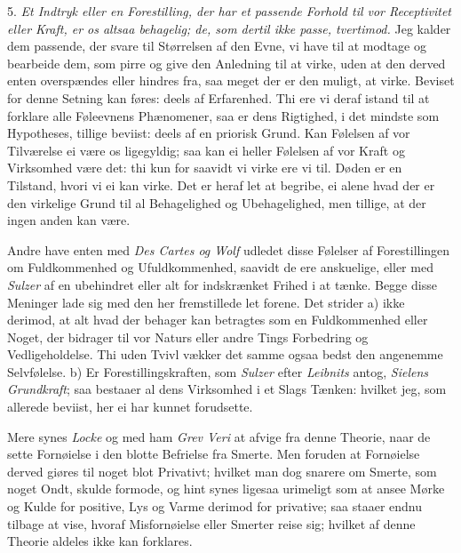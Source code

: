 \documentclass[12pt,a4paper]{article}
\newcommand{\opage}[1]{\marginnote{\footnotesize\textit{[#1]}}}
\begin{document}
5. \emph{Et Indtryk eller en Forestilling, der har et passende Forhold til vor
Receptivitet eller Kraft, er os altsaa behagelig; de, som dertil ikke passe, tvertimod.}
Jeg kalder dem passende, der svare til Størrelsen af den Evne, vi have til at modtage og
bearbeide dem, som pirre og give den Anledning til at virke, uden at den derved enten
overspændes eller hindres fra, saa meget der er den muligt, at virke. Beviset for denne
Setning kan føres: deels af Erfarenhed. Thi ere vi deraf istand til at forklare alle
Føleevnens Phænomener, saa er dens Rigtighed, i det mindste som Hypotheses, tillige
beviist: deels af en priorisk Grund. Kan Følelsen af vor Tilværelse ei være os ligegyldig;
saa kan ei heller Følelsen af vor Kraft og Virksomhed være det: thi kun for saavidt vi
virke ere vi til. Døden er en Tilstand, hvori vi ei kan virke. Det er heraf let at
begribe, ei alene hvad der er den virkelige Grund til al Behagelighed og Ubehagelighed,
men tillige, at der ingen anden kan være.

Andre have enten med \emph{Des Cartes og Wolf} udledet disse Følelser af Forestillingen om
Fuldkommenhed og Ufuldkommenhed, saavidt de ere anskuelige, eller med \emph{Sulzer} af en
ubehindret eller alt for indskrænket Frihed i at tænke. Begge disse Meninger lade
\opage{199} sig med den her fremstillede let forene. Det strider a) ikke derimod, at alt hvad der
behager kan betragtes som en Fuldkommenhed eller Noget, der bidrager til vor Naturs eller
andre Tings Forbedring og Vedligeholdelse. Thi uden Tvivl vækker det samme ogsaa bedst den
angenemme Selvfølelse. b) Er Forestillingskraften, som \emph{Sulzer} efter
\emph{Leibnits} antog, \emph{Sielens Grundkraft}; saa bestaaer al dens Virksomhed i et
Slags Tænken: hvilket jeg, som allerede beviist, her ei har kunnet forudsette.

Mere synes \emph{Locke} og med ham \emph{Grev Veri} at afvige fra denne Theorie, naar de
sette Fornøielse i den blotte Befrielse fra Smerte. Men foruden at Fornøielse derved
giøres til noget blot Privativt; hvilket man dog snarere om Smerte, som noget Ondt, skulde
formode, og hint synes ligesaa urimeligt som at ansee Mørke og Kulde for positive, Lys og
Varme derimod for privative; saa staaer endnu tilbage at vise, hvoraf Misfornøielse eller
Smerter reise sig; hvilket af denne Theorie aldeles ikke kan forklares.
\end{document}
